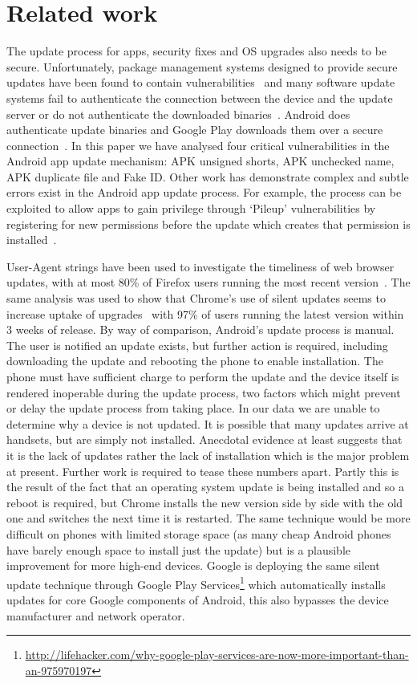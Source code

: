 \documentclass{sig-alternate}
\begin{document}
\section{Related work}
The update process for apps, security fixes and OS upgrades also needs to be secure.
Unfortunately, package management systems designed to provide secure updates have been found to contain vulnerabilities~\cite{Cappos2008} and many software update systems fail to authenticate the connection between the device and the update server or do not authenticate the downloaded binaries~\cite{Bellissimo2006}.
Android does authenticate update binaries and Google Play downloads them over a secure connection~\cite{Viennot2014}.
In this paper we have analysed four critical vulnerabilities in the Android app update mechanism: APK unsigned shorts, APK unchecked name, APK duplicate file and Fake ID.
Other work has demonstrate complex and subtle errors exist in the Android app update process.
For example, the process can be exploited to allow apps to gain privilege through `Pileup' vulnerabilities by registering for new permissions before the update which creates that permission is installed~\cite{Xing2014}.

User-Agent strings have been used to investigate the timeliness of web browser updates, with at most 80\% of Firefox users running the most recent version~\cite{Frei2008}.
The same analysis was used to show that Chrome's use of silent updates seems to increase uptake of upgrades~\cite{Duebendorfer2010} with 97\% of users running the latest version within 3 weeks of release.
By way of comparison, Android's update process is manual.
The user is notified an update exists, but further action is required, including downloading the update and rebooting the phone to enable installation.
The phone must have sufficient charge to perform the update and the device itself is rendered inoperable during the update process, two factors which might prevent or delay the update process from taking place.
In our data we are unable to determine why a device is not updated. 
It is possible that many updates arrive at handsets, but are simply not installed.
Anecdotal evidence at least suggests that it is the lack of updates rather the lack of installation which is the major problem at present. Further work is required to tease these numbers apart.
Partly this is the result of the fact that an operating system update is being installed and so a reboot is required, but Chrome installs the new version side by side with the old one and switches the next time it is restarted.
The same technique would be more difficult on phones with limited storage space (as many cheap Android phones have barely enough space to install just the update) but is a plausible improvement for more high-end devices.
Google is deploying the same silent update technique through Google Play Services\footnote{\href{http://lifehacker.com/why-google-play-services-are-now-more-important-than-an-975970197}{http://lifehacker.com/why-google-play-services-are-now-more-important-than-an-975970197}} which automatically installs updates for core Google components of Android, this also bypasses the device manufacturer and network operator.
\end{document}
